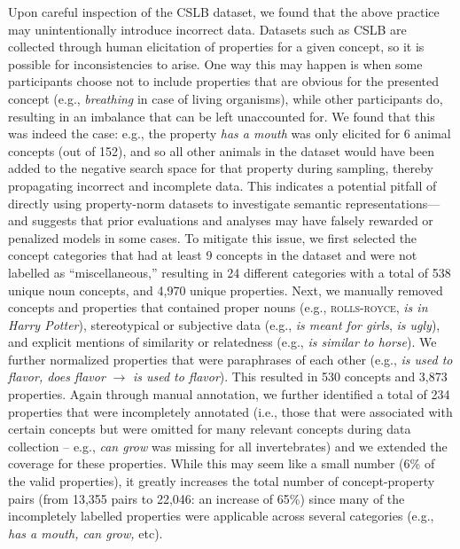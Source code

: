 \documentclass[10pt,letterpaper]{article}
\newcommand{\ake}[1]{\textcolor{blue}{$_{AE}$[#1]}}
\begin{document}
Upon careful inspection of the CSLB dataset, we found that the above practice may unintentionally introduce incorrect data.
Datasets such as CSLB are collected through human elicitation of properties for a given concept,
so it is possible for inconsistencies to arise. One way this may happen is when some participants choose not to include properties that are obvious for the presented concept (e.g., \textit{breathing} in case of living organisms), while other participants do, resulting in an imbalance that can be left unaccounted for.
We found that this was indeed the case: e.g., the property \textit{has a mouth} was only elicited for 6 animal concepts (out of 152), and so all other animals in the dataset would have been added to the negative search space for that property during sampling, thereby propagating incorrect and incomplete data. This indicates a potential pitfall of directly using property-norm datasets to investigate semantic representations---and suggests that prior evaluations and analyses \citep{lucy-gauthier-2017-distributional, da-kasai-2019-cracking, bhatia2020transformer} may have falsely rewarded or penalized models in some cases.
To mitigate this issue, we first selected the concept categories \citep[hand-annotated by][e.g., \textsc{bird, vehicle, tree}, etc.]{devereux2014centre} that had at least 9 concepts in the dataset and were not labelled as ``miscellaneous,'' resulting in 24 different categories with a total of 538 unique noun concepts, and 4{,}970 unique properties.
Next, we manually removed concepts and properties that contained proper nouns (e.g., \textsc{rolls-royce}, \textit{is in Harry Potter}), stereotypical or subjective data (e.g., \textit{is meant for girls}, \textit{is ugly}), and explicit mentions of similarity or relatedness (e.g., \textit{is similar to horse}). We further normalized properties that were paraphrases of each other (e.g., \textit{is used to flavor, does flavor} $\rightarrow$ \textit{is used to flavor}). This resulted in 530 concepts and  3{,}873 properties.
Again through manual annotation, we further identified a total of 234 properties that were incompletely annotated (i.e., those that were associated with certain concepts but were omitted for many relevant concepts during data collection -- e.g., \textit{can grow} was missing for all invertebrates) and we extended the coverage for these properties. 
While this may seem like a small number (6\% of the valid properties), it greatly increases the total number of concept-property pairs (from 13{,}355 pairs to 22{,}046: an increase of 65\%) since many of the incompletely labelled properties were applicable across several categories (e.g., \textit{has a mouth, can grow,} etc).
\end{document}
